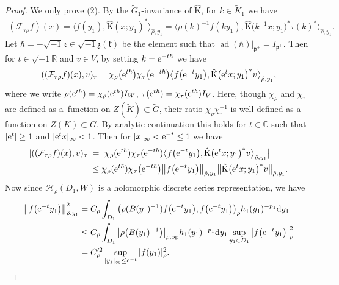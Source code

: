 \documentclass[pdftex]{sigma}
\numberwithin{equation}{section}
\newcommand{\BR}{\mathbb{R}}
\newcommand{\BC}{\mathbb{C}}
\newcommand{\fk}{\mathfrak{k}}
\newcommand{\fp}{\mathfrak{p}}
\newcommand{\fz}{\mathfrak{z}}
\newcommand{\cF}{\mathcal{F}}
\newcommand{\cH}{\mathcal{H}}
\newcommand{\rK}{\mathrm{K}}
\begin{document}
\begin{proof}
We only prove (2). By the $\tilde{G}_1$-invariance of $\hat{\rK}$, for $k\in \tilde{K}_1$ we have
\begin{gather*} (\cF_{\tau\rho}f)(x)=\big\langle f(y_1),\hat{\rK}(x;y_1)^*\big\rangle_{\hat{\rho},y_1}
=\big\langle \rho(k)^{-1}f(ky_1),\hat{\rK}\big(k^{-1}x;y_1\big)^*\tau(k)^*\big\rangle_{\hat{\rho},y_1}. \end{gather*}
Let $\hbar=-\sqrt{-1}z\in\sqrt{-1}\fz(\fk)$ be the element such that $\operatorname{ad}(\hbar)|_{\fp^+}=I_{\fp^+}$.
Then for $t\in\sqrt{-1}\BR$ and $v\in V$, by setting $k={\rm e}^{-t\hbar}$ we have
\begin{gather*} ((\cF_{\tau\rho}f)(x),v)_\tau=\chi_\rho\big({\rm e}^{t\hbar}\big)\chi_\tau\big({\rm e}^{-t\hbar}\big)\big\langle f\big({\rm e}^{-t}y_1\big),
\hat{\rK}\big({\rm e}^tx;y_1\big)^*v\big\rangle_{\hat{\rho},y_1}, \end{gather*}
where we write $\rho({\rm e}^{t\hbar})=\chi_\rho({\rm e}^{t\hbar})I_W$, $\tau({\rm e}^{t\hbar})=\chi_\tau({\rm e}^{t\hbar})I_V$.
Here, though $\chi_\rho$ and $\chi_\tau$ are defined as a~function on $Z(\tilde{K})\subset \tilde{G}$,
their ratio $\chi_\rho\chi_\tau^{-1}$ is well-defined as a function on $Z(K)\subset G$.
By analytic continuation this holds for $t\in\BC$ such that $|{\rm e}^t|\ge 1$ and $|{\rm e}^t x|_\infty <1$.
Then for $|x|_\infty<{\rm e}^{-t}\le 1$ we have
\begin{align*}
|((\cF_{\tau\rho}f)(x),v)_\tau|&=\big|\chi_\rho({\rm e}^{t\hbar})\chi_\tau({\rm e}^{-t\hbar})\big\langle f\big({\rm e}^{-t}y_1\big),
\hat{\rK}\big({\rm e}^tx;y_1\big)^*v\big\rangle_{\hat{\rho},y_1}\big| \\
&\le \chi_\rho({\rm e}^{t\hbar})\chi_\tau\big({\rm e}^{-t\hbar}\big)\big\Vert f\big({\rm e}^{-t}y_1\big)\big\Vert_{\hat{\rho},y_1}
\big\Vert\hat{\rK}\big({\rm e}^tx;y_1\big)^*v\big\Vert_{\hat{\rho},y_1}.
\end{align*}
Now since $\cH_\rho(D_1,W)$ is a holomorphic discrete series representation, we have
\begin{align*}
\big\Vert f\big({\rm e}^{-t}y_1\big)\big\Vert_{\hat{\rho},y_1}^2
&=C_\rho\int_{D_1}\big(\rho(B(y_1)^{-1})f\big({\rm e}^{-t}y_1\big),f\big({\rm e}^{-t}y_1\big)\big)_\rho h_1(y_1)^{-p_1}{\rm d}y_1 \\
&\le C_\rho\int_{D_1}\big|\rho\big(B(y_1)^{-1}\big)\big|_{\rho,\mathrm{op}}h_1(y_1)^{-p_1}{\rm d}y_1 \sup_{y_1\in D_1}\big|f\big({\rm e}^{-t}y_1\big)\big|_\rho^2 \\
&=C_\rho^{\prime 2}\sup_{|y_1|_\infty\le {\rm e}^{-t}} |f(y_1)|_\rho^2.

\end{align*}
\end{proof}
\end{document}
